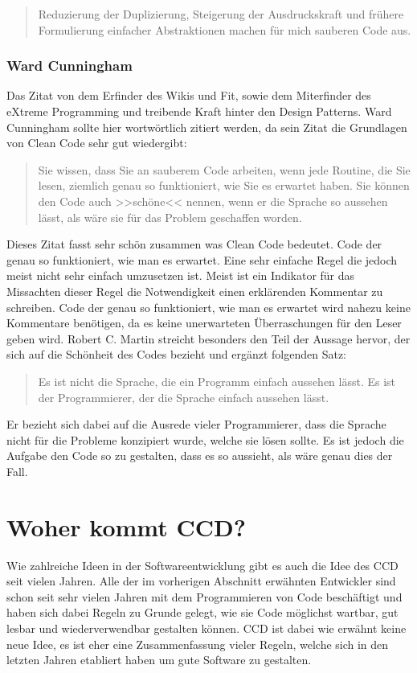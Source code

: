 \begin{quotation}
Reduzierung der Duplizierung, Steigerung der Ausdruckskraft und frühere Formulierung einfacher Abstraktionen machen für mich sauberen Code aus.
\end{quotation}

\subsubsection{Ward Cunningham}
Das Zitat von dem Erfinder des Wikis und Fit, sowie dem Miterfinder des eXtreme Programming und treibende Kraft hinter den Design Patterns. Ward Cunningham sollte hier wortwörtlich zitiert werden, da sein Zitat die Grundlagen von Clean Code sehr gut wiedergibt:

\begin{quotation}
	Sie wissen, dass Sie an sauberem Code arbeiten, wenn jede Routine, die Sie lesen, ziemlich genau so funktioniert, wie Sie es erwartet haben. Sie können den Code auch >>schöne<< nennen, wenn er die Sprache so aussehen lässt, als wäre sie für das Problem geschaffen worden.
\end{quotation}

Dieses Zitat fasst sehr schön zusammen was Clean Code bedeutet. Code der genau so funktioniert, wie man es erwartet. Eine sehr einfache Regel die jedoch meist nicht sehr einfach umzusetzen ist. Meist ist ein Indikator für das Missachten dieser Regel die Notwendigkeit einen erklärenden Kommentar zu schreiben. Code der genau so funktioniert, wie man es erwartet wird nahezu keine Kommentare benötigen, da es keine unerwarteten Überraschungen für den Leser geben wird. Robert C. Martin streicht besonders den Teil der Aussage hervor, der sich auf die Schönheit des Codes bezieht und ergänzt folgenden Satz:

\begin{quotation}
Es ist nicht die Sprache, die ein Programm einfach aussehen lässt. Es ist der Programmierer, der die Sprache einfach aussehen lässt.
\end{quotation}

Er bezieht sich dabei auf die Ausrede vieler Programmierer, dass die Sprache nicht für die Probleme konzipiert wurde, welche sie lösen sollte. Es ist jedoch die Aufgabe den Code so zu gestalten, dass es so aussieht, als wäre genau dies der Fall.

\section{Woher kommt CCD?}
Wie zahlreiche Ideen in der Softwareentwicklung gibt es auch die Idee des CCD seit vielen Jahren. Alle der im vorherigen Abschnitt erwähnten Entwickler sind schon seit sehr vielen Jahren mit dem Programmieren von Code beschäftigt und haben sich dabei Regeln zu Grunde gelegt, wie sie Code möglichst wartbar, gut lesbar und wiederverwendbar gestalten können. CCD ist dabei wie erwähnt keine neue Idee, es ist eher eine Zusammenfassung vieler Regeln, welche sich in den letzten Jahren etabliert haben um gute Software zu gestalten.

